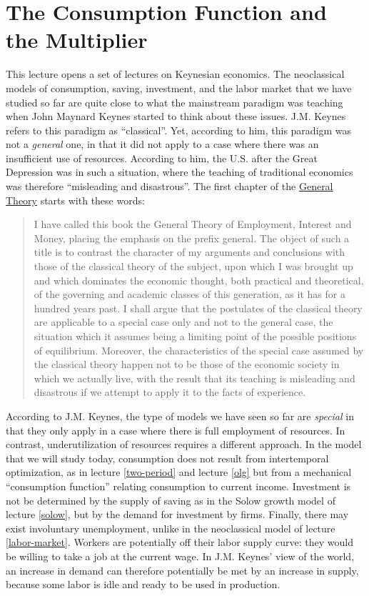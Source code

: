 \documentclass[]{book}
\begin{document}
\hypertarget{cons-function}{\chapter{The Consumption Function and the
Multiplier}\label{cons-function}}

This lecture opens a set of lectures on Keynesian economics. The
neoclassical models of consumption, saving, investment, and the labor
market that we have studied so far are quite close to what the
mainstream paradigm was teaching when John Maynard Keynes started to
think about these issues. J.M. Keynes refers to this paradigm as
``classical''. Yet, according to him, this paradigm was not a
\emph{general} one, in that it did not apply to a case where there was
an insufficient use of resources. According to him, the U.S. after the
Great Depression was in such a situation, where the teaching of
traditional economics was therefore ``misleading and disastrous''. The
first chapter of the
\href{http://cas2.umkc.edu/economics/people/facultypages/kregel/courses/econ645/winter2011/generaltheory.pdf}{General
Theory} starts with these words:

\begin{quote}
I have called this book the General Theory of Employment, Interest and
Money, placing the emphasis on the prefix general. The object of such a
title is to contrast the character of my arguments and conclusions with
those of the classical theory of the subject, upon which I was brought
up and which dominates the economic thought, both practical and
theoretical, of the governing and academic classes of this generation,
as it has for a hundred years past. I shall argue that the postulates of
the classical theory are applicable to a special case only and not to
the general case, the situation which it assumes being a limiting point
of the possible positions of equilibrium. Moreover, the characteristics
of the special case assumed by the classical theory happen not to be
those of the economic society in which we actually live, with the result
that its teaching is misleading and disastrous if we attempt to apply it
to the facts of experience.
\end{quote}

According to J.M. Keynes, the type of models we have seen so far are
\emph{special} in that they only apply in a case where there is full
employment of resources. In contrast, underutilization of resources
requires a different approach. In the model that we will study today,
consumption does not result from intertemporal optimization, as in
lecture \ref{two-period} and lecture \ref{olg} but from a mechanical
``consumption function'' relating consumption to current income.
Investment is not be determined by the supply of saving as in the Solow
growth model of lecture \ref{solow}, but by the demand for investment by
firms. Finally, there may exist involuntary unemployment, unlike in the
neoclassical model of lecture \ref{labor-market}. Workers are
potentially off their labor supply curve: they would be willing to take
a job at the current wage. In J.M. Keynes' view of the world, an
increase in demand can therefore potentially be met by an increase in
supply, because some labor is idle and ready to be used in production.
\end{document}
